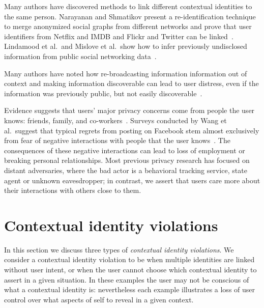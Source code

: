 \documentclass[10pt, conference, compsocconf]{IEEEtran}
\begin{document}
Many authors have discovered methods to link different contextual identities to
the same person. Narayanan and Shmatikov present a re-identification technique
to merge anonymized social graphs from different networks and prove that
user identifiers from Netflix and IMDB and Flickr and Twitter can be
linked~\cite{narayanan1,narayanan2}. Lindamood et al.~and Mislove et al.~show
how to infer previously undisclosed information from public social networking
data~\cite{lindamood,mislove}.

Many authors have noted how re-broadcasting information information out of
context and making information discoverable can lead to user distress, even if
the information was previously public, but not easily
discoverable~\cite{boyd1,chew,nissenbaum}.

Evidence suggests that users' major privacy concerns come from people the user
knows: friends, family, and co-workers~\cite{fbtips2,fbtips1}.  Surveys
conducted by Wang et al.~suggest that typical regrets from posting on Facebook
stem almost exclusively from fear of negative interactions with people that the
user knows~\cite{wang}. The consequences of these negative interactions can
lead to loss of employment or breaking personal relationships.  Most previous
privacy research has focused on distant adversaries, where the bad actor is a
behavioral tracking service, state agent or unknown eavesdropper; in contrast,
we assert that users care more about their interactions with others close to
them.

\section{Contextual identity violations}
In this section we discuss three types of \textit{contextual identity
violations}. We consider a contextual identity violation to be when multiple
identities are linked without user intent, or when the user cannot choose which
contextual identity to assert in a given situation. In these examples the user
may not be conscious of what a contextual identity is: nevertheless each
example illustrates a loss of user control over what aspects of self to
reveal in a given context.

\label{sec:examples}
\end{document}
